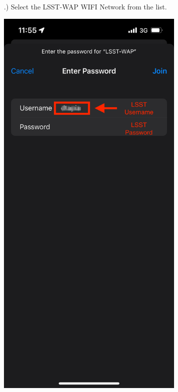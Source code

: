 \begin{figure}
\begin{subfigure}{0.30\textwidth}
      .) Select the LSST-WAP WIFI Network from the list.
    \end{subfigure}
      \hfill
    \begin{subfigure}{0.30\textwidth}
      \includegraphics[width=\textwidth]{Images/ios2.png}

\end{subfigure}
\end{figure}
